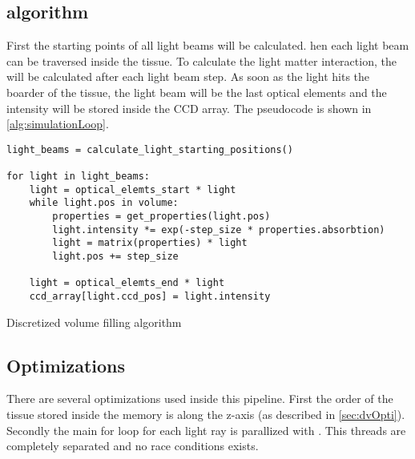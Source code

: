 \subsection{algorithm}
%
First the starting points of all light beams will be calculated.
hen each light beam can be traversed inside the tissue.
To calculate the light matter interaction, the \dummy{} will be calculated after each light beam step.
As soon as the light hits the boarder of the tissue, the light beam will be the last optical elements and the intensity will be stored inside the \ac{CCD} array.
The pseudocode is shown in \cref{alg:simulationLoop}.
%
\begin{lstfloat}[!tb]
\lstset{style=python}
\begin{lstlisting}[]
light_beams = calculate_light_starting_positions()

for light in light_beams:
    light = optical_elemts_start * light
    while light.pos in volume:
        properties = get_properties(light.pos)
        light.intensity *= exp(-step_size * properties.absorbtion)
        light = matrix(properties) * light
        light.pos += step_size
   
    light = optical_elemts_end * light
    ccd_array[light.ccd_pos] = light.intensity
\end{lstlisting}
\caption{Discretized volume filling algorithm}
\label{alg:simulationLoop}
\end{lstfloat}
%
%
%
\subsection{Optimizations}
%
There are several optimizations used inside this pipeline.
First the order of the tissue stored inside the memory is along the z-axis (as described in \cref{sec:dvOpti}).
Secondly the main for loop for each light ray is parallized with \openmp{}.
This threads are completely separated and no race conditions exists.
%
%
%
